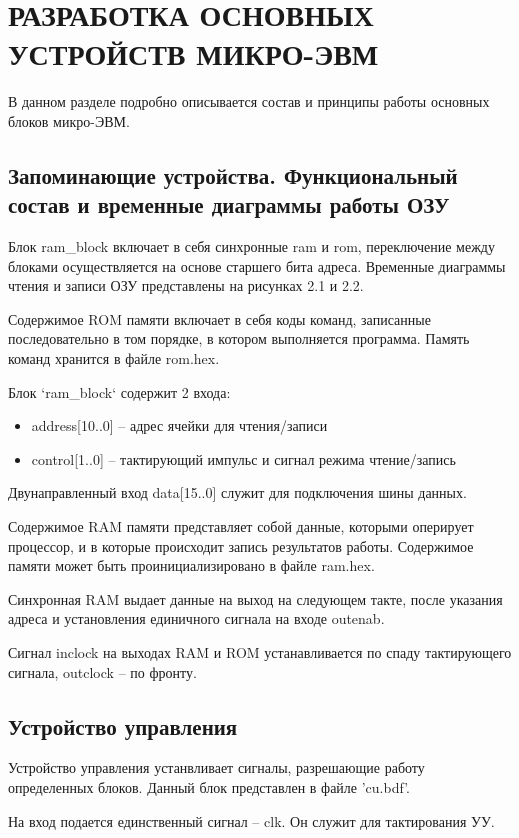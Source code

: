 \lstset{style=fsharpstyle}

\section{РАЗРАБОТКА ОСНОВНЫХ УСТРОЙСТВ МИКРО-ЭВМ}
\label{sec:practice:technology_used}

В данном разделе подробно описывается состав и принципы работы основных блоков микро-ЭВМ.

\subsection{Запоминающие устройства. Функциональный состав и временные диаграммы работы ОЗУ}
Блок ram\_block включает в себя синхронные ram и rom, переключение между блоками осуществляется на основе старшего бита адреса.
Временные диаграммы чтения и записи ОЗУ представлены на рисунках 2.1 и 2.2.

Содержимое ROM памяти включает в себя коды команд, записанные последовательно в том порядке, в котором выполняется программа.
Память команд хранится в файле rom.hex.

Блок `ram\_block` содержит 2 входа:
\begin{itemize}
    \item address[10..0] -- адрес ячейки для чтения/записи
    \item control[1..0] -- тактирующий импульс и сигнал режима чтение/запись
\end{itemize}
Двунаправленный вход data[15..0] служит для подключения шины данных.

Содержимое RAM памяти представляет собой данные, которыми оперирует процессор, и в которые происходит запись результатов работы. Содержимое памяти может быть проинициализировано в файле ram.hex.

Синхронная RAM выдает данные на выход на следующем такте, после указания адреса и установления единичного сигнала на входе outenab.

Сигнал inclock на выходах RAM и ROM устанавливается по спаду тактирующего сигнала, outclock -- по фронту.

\subsection{Устройство управления}
Устройство управления устанвливает сигналы, разрешающие работу определенных блоков.
Данный блок представлен в файле 'cu.bdf'.

На вход подается единственный сигнал -- clk. Он служит для тактирования УУ.

